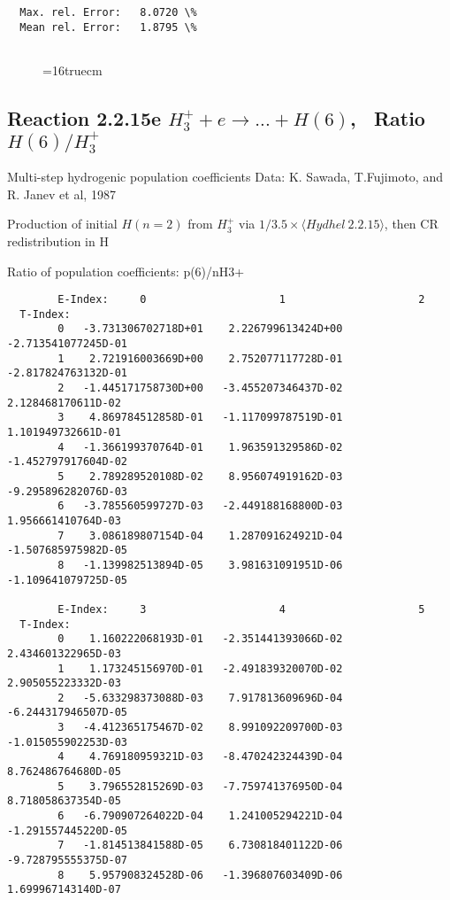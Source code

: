 \documentclass[12pt,dvipdfmx]{article}
\begin{document}
{\begin{small}
\begin{verbatim}
  Max. rel. Error:   8.0720 \%
  Mean rel. Error:   1.8795 \%


\end{verbatim}\end{small}
\begin{figure} \label{2.2.15d}
\epsfxsize=16truecm
\end{figure}
\newpage
\subsection{
Reaction 2.2.15e $ H_3^+ + e \rightarrow ...+ H(6) $, \   Ratio $H(6)/H_3^+  $
}

 Multi-step hydrogenic population coefficients
 Data: K. Sawada, T.Fujimoto, \cite{kn:Sawada} and R. Janev et al, 1987

 Production of initial $H(n=2)$ from $H_3^+$ via $1/3.5 \times \langle Hydhel~ 2.2.15\rangle$,
 then CR redistribution in H

 Ratio of population coefficients: p(6)/nH3+

\begin{small}\begin{verbatim}
        E-Index:     0                     1                     2
  T-Index:
        0   -3.731306702718D+01    2.226799613424D+00   -2.713541077245D-01
        1    2.721916003669D+00    2.752077117728D-01   -2.817824763132D-01
        2   -1.445171758730D+00   -3.455207346437D-02    2.128468170611D-02
        3    4.869784512858D-01   -1.117099787519D-01    1.101949732661D-01
        4   -1.366199370764D-01    1.963591329586D-02   -1.452797917604D-02
        5    2.789289520108D-02    8.956074919162D-03   -9.295896282076D-03
        6   -3.785560599727D-03   -2.449188168800D-03    1.956661410764D-03
        7    3.086189807154D-04    1.287091624921D-04   -1.507685975982D-05
        8   -1.139982513894D-05    3.981631091951D-06   -1.109641079725D-05

        E-Index:     3                     4                     5
  T-Index:
        0    1.160222068193D-01   -2.351441393066D-02    2.434601322965D-03
        1    1.173245156970D-01   -2.491839320070D-02    2.905055223332D-03
        2   -5.633298373088D-03    7.917813609696D-04   -6.244317946507D-05
        3   -4.412365175467D-02    8.991092209700D-03   -1.015055902253D-03
        4    4.769180959321D-03   -8.470242324439D-04    8.762486764680D-05
        5    3.796552815269D-03   -7.759741376950D-04    8.718058637354D-05
        6   -6.790907264022D-04    1.241005294221D-04   -1.291557445220D-05
        7   -1.814513841588D-05    6.730818401122D-06   -9.728795555375D-07
        8    5.957908324528D-06   -1.396807603409D-06    1.699967143140D-07


\end{verbatim}
\end{small}}
\end{document}
